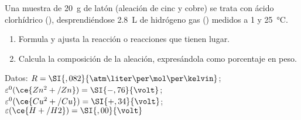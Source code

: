 Una muestra de \SI{20}{\gram} de latón (aleación de cinc y cobre) se trata con ácido clorhídrico (), desprendiéndose \SI{2,8}{\liter} de hidrógeno gas () medidos a \SI{1}{\atm} y \SI{25}{\celsius}.
\begin{enumerate}[label={\alph*)},font=\bfseries]
	\item Formula y ajusta la reacción o reacciones que tienen lugar.
	\item Calcula la composición de la aleación, expresándola como porcentaje en peso.
\end{enumerate}
Datos: $R = \SI{,082}{\atm\liter\per\mol\per\kelvin}$;
$\varepsilon^0(\ce{Zn^2+/Zn})= \SI{-,76}{\volt}$;
$\varepsilon^0(\ce{Cu^2+/Cu})=\SI{+,34}{\volt}$;
$\varepsilon(\ce{H+/H2})=\SI{,00}{\volt}$
